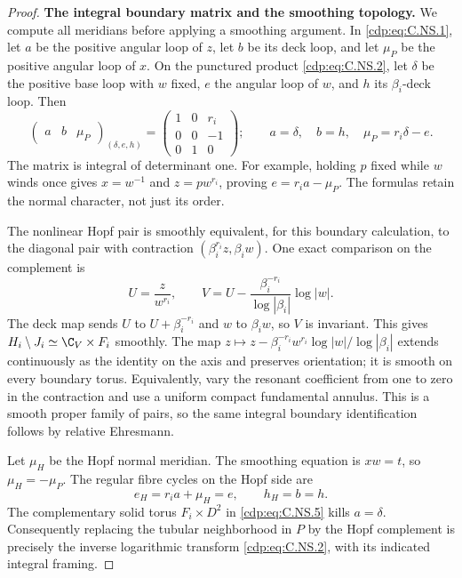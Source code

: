 \begin{proof}
\par\medskip\noindent\textbf{The integral boundary matrix and the smoothing topology.}
We compute all meridians before applying a smoothing
argument. In \eqref{cdp:eq:C.NS.1}, let $a$ be the positive angular
loop of $z$, let $b$ be its deck loop, and let
$\mu_P$ be the positive angular loop of $x$. On the
punctured product \eqref{cdp:eq:C.NS.2}, let $\delta$ be the
positive base loop with $w$ fixed, $e$ the angular
loop of $w$, and $h$ its $\beta_i$-deck loop. Then
\[
 \begin{pmatrix}a&b&\mu_P\end{pmatrix}_{(\delta,e,h)}
       =
 \begin{pmatrix}
  1&0&r_i\\
  0&0&-1\\
  0&1&0
 \end{pmatrix};
 \qquad
 a=\delta,\quad b=h,\quad \mu_P=r_i\delta-e.
                                                        \tag{C.NS.4}\label{cdp:eq:C.NS.4}
\]
The matrix is integral of determinant one. For example,
holding $p$ fixed while $w$ winds once gives
$x=w^{-1}$ and $z=pw^{r_i}$, proving
$e=r_i a-\mu_P$. The formulas retain the normal
character, not just its order.

The nonlinear Hopf pair is smoothly equivalent, for
this boundary calculation, to the diagonal pair with
contraction $(\beta_i^{r_i}z,\beta_i w)$. One exact
comparison on the complement is
\[
 U=\frac{z}{w^{r_i}},\qquad
 V=U-\frac{\beta_i^{-r_i}}{\log|\beta_i|}\log|w|.
                                                        \tag{C.NS.5}\label{cdp:eq:C.NS.5}
\]
The deck map sends $U$ to $U+\beta_i^{-r_i}$ and
$w$ to $\beta_iw$, so $V$ is invariant. This gives
$H_i\setminus J_i\simeq\C_V\times F_i$ smoothly.
The map
$z\mapsto z-\beta_i^{-r_i}w^{r_i}\log|w|/\log|\beta_i|$
extends continuously as the identity on the axis and
preserves orientation; it is smooth on every boundary
torus. Equivalently, vary the resonant coefficient from
one to zero in the contraction and use a uniform
compact fundamental annulus. This is a smooth proper
family of pairs, so the same integral boundary
identification follows by relative Ehresmann.

Let $\mu_H$ be the Hopf normal meridian. The
smoothing equation is $xw=t$, so
$\mu_H=-\mu_P$. The regular fibre cycles on the
Hopf side are
\[
                   e_H=r_i a+\mu_H=e,\qquad h_H=b=h.
                                                        \tag{C.NS.6}\label{cdp:eq:C.NS.6}
\]
The complementary solid torus $F_i\times D^2$ in
\eqref{cdp:eq:C.NS.5} kills $a=\delta$. Consequently replacing
the tubular neighborhood in $P$ by the Hopf
complement is precisely the inverse logarithmic
transform \eqref{cdp:eq:C.NS.2}, with its indicated integral
framing.


\end{proof}
